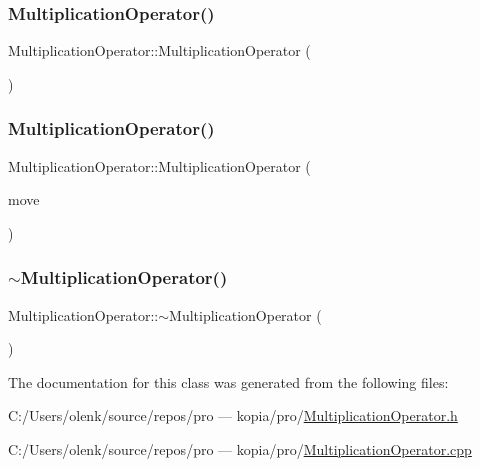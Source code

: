 \subsubsection{\texorpdfstring{MultiplicationOperator()}{MultiplicationOperator()}\hspace{0.1cm}{\footnotesize\ttfamily [1/2]}}
{\footnotesize\ttfamily Multiplication\+Operator\+::\+Multiplication\+Operator (\begin{DoxyParamCaption}{ }\end{DoxyParamCaption})}

\mbox{\label{class_multiplication_operator_a3a8b5ade5a878eb1bfa5445a05bacb86}} 
\subsubsection{\texorpdfstring{MultiplicationOperator()}{MultiplicationOperator()}\hspace{0.1cm}{\footnotesize\ttfamily [2/2]}}
{\footnotesize\ttfamily Multiplication\+Operator\+::\+Multiplication\+Operator (\begin{DoxyParamCaption}\item[{\mbox{\hyperlink{class_multiplication_operator}{Multiplication\+Operator}} \&\&}]{move }\end{DoxyParamCaption})}

\mbox{\label{class_multiplication_operator_a1aab7606a603780d2b03b96d8fd6fb4a}} 
\subsubsection{\texorpdfstring{$\sim$MultiplicationOperator()}{~MultiplicationOperator()}}
{\footnotesize\ttfamily Multiplication\+Operator\+::$\sim$\+Multiplication\+Operator (\begin{DoxyParamCaption}{ }\end{DoxyParamCaption})}



The documentation for this class was generated from the following files\+:\begin{DoxyCompactItemize}
\item 
C\+:/\+Users/olenk/source/repos/pro — kopia/pro/\mbox{\hyperlink{_multiplication_operator_8h}{Multiplication\+Operator.\+h}}\item 
C\+:/\+Users/olenk/source/repos/pro — kopia/pro/\mbox{\hyperlink{_multiplication_operator_8cpp}{Multiplication\+Operator.\+cpp}}\end{DoxyCompactItemize}
